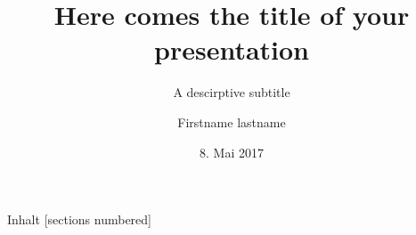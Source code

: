 \title[A short title]{Here comes the title of your presentation}
\subtitle{A descirptive subtitle}
\author{Firstname lastname}
\date{8. Mai 2017}

\begin{frame}
	\titlepage
\end{frame}

\begin{frame}[c]{Inhalt}
	[sections numbered]
	\tableofcontents[hideallsubsections] %
\end{frame}

